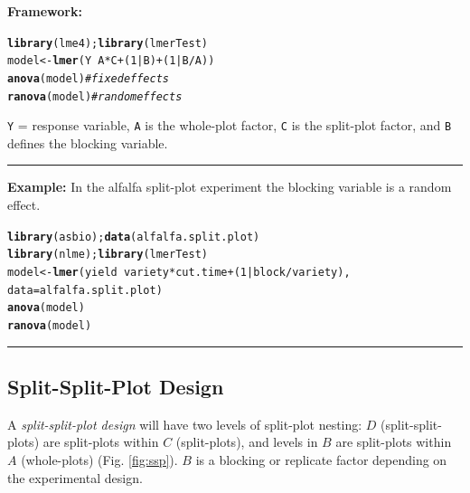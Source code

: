 \documentclass[12pt,english]{article}\usepackage[]{graphicx}\usepackage[table]{xcolor}
\makeatletter
\newcommand{\hlnum}[1]{\textcolor[rgb]{0.686,0.059,0.569}{#1}}%
\newcommand{\hlcom}[1]{\textcolor[rgb]{0.678,0.584,0.686}{\textit{#1}}}%
\newcommand{\hlopt}[1]{\textcolor[rgb]{0,0,0}{#1}}%
\newcommand{\hldef}[1]{\textcolor[rgb]{0.345,0.345,0.345}{#1}}%
\newcommand{\hlkwb}[1]{\textcolor[rgb]{0.69,0.353,0.396}{#1}}%
\newcommand{\hlkwc}[1]{\textcolor[rgb]{0.333,0.667,0.333}{#1}}%
\newcommand{\hlkwd}[1]{\textcolor[rgb]{0.737,0.353,0.396}{\textbf{#1}}}%
\newenvironment{kframe}{%
 \def\at@end@of@kframe{}%
 \ifinner\ifhmode%
  \def\at@end@of@kframe{\end{minipage}}%
  \begin{minipage}{\columnwidth}%
 \fi\fi%
 \def\FrameCommand##1{\hskip\@totalleftmargin \hskip-\fboxsep
 \colorbox{shadecolor}{##1}\hskip-\fboxsep
     \hskip-\linewidth \hskip-\@totalleftmargin \hskip\columnwidth}%
 \MakeFramed {\advance\hsize-\width
   \@totalleftmargin\z@ \linewidth\hsize
   \@setminipage}}%
 {\par\unskip\endMakeFramed%
 \at@end@of@kframe}
\newenvironment{knitrout}{}{} %
\makeatother
\begin{document}
\begin{tcolorbox}[colback=yellow!50!red!25!white,colbacktitle=yellow!50!red,colframe=black!75!white,title=\textbf{R:} RBSP with Mixed Models]
\textbf{Framework:}\\
\vspace{-.2in}
\begin{knitrout}
\color{fgcolor}\begin{kframe}
\begin{alltt}
\hlkwd{library}\hldef{(lme4);} \hlkwd{library}\hldef{(lmerTest)}
\hldef{model} \hlkwb{<-} \hlkwd{lmer}\hldef{(Y} \hlopt{~} \hldef{A} \hlopt{*} \hldef{C} \hlopt{+} \hldef{(}\hlnum{1}\hlopt{|}\hldef{B)} \hlopt{+} \hldef{(}\hlnum{1}\hlopt{|}\hldef{B}\hlopt{/}\hldef{A))}
\hlkwd{anova}\hldef{(model)} \hlcom{# fixed effects}
\hlkwd{ranova}\hldef{(model)} \hlcom{# random effects}
\end{alltt}
\end{kframe}
\end{knitrout}
\texttt{Y} = response variable, \texttt{A} is the whole-plot factor, \texttt{C} is the split-plot factor, and \texttt{B} defines the blocking variable.
\vspace{0.1in}
\par\noindent\rule{.9\textwidth}{0.4pt}

\textbf{Example:} In the alfalfa split-plot experiment the blocking variable is a random effect.
\begin{knitrout}
\color{fgcolor}\begin{kframe}
\begin{alltt}
\hlkwd{library}\hldef{(asbio);} \hlkwd{data}\hldef{(alfalfa.split.plot)}
\hlkwd{library}\hldef{(nlme);} \hlkwd{library}\hldef{(lmerTest)}
\hldef{model} \hlkwb{<-} \hlkwd{lmer}\hldef{(yield} \hlopt{~} \hldef{variety} \hlopt{*} \hldef{cut.time} \hlopt{+} \hldef{(}\hlnum{1}\hlopt{|}\hldef{block}\hlopt{/}\hldef{variety),}
          \hlkwc{data} \hldef{= alfalfa.split.plot)}
\hlkwd{anova}\hldef{(model)}
\hlkwd{ranova}\hldef{(model)}
\end{alltt}
\end{kframe}
\end{knitrout}
\end{tcolorbox}

\par\noindent\rule{.9\textwidth}{0.4pt}
\subsection{Split-Split-Plot Design}
A \textit{split-split-plot design} will have two levels of split-plot nesting: $D$ (split-split-plots) are split-plots within $C$ (split-plots), and levels in $B$ are split-plots within $A$ (whole-plots) (Fig. \ref{fig:ssp}). $B$ is a blocking or replicate factor depending on the experimental design.
\end{document}
